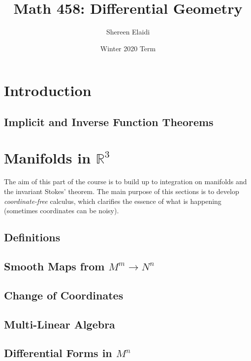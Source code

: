 \documentclass[11pt]{scrartcl}
\title{\textbf{Math 458: Differential Geometry}}
\author{Shereen Elaidi}
\date{Winter 2020 Term}
\newcommand{\R}[0]{\mathbb{R}}
\theoremstyle{definition}
\theoremstyle{remark}
\begin{document}
\maketitle
\tableofcontents
\pagestyle{fancy}
\lfoot{}
\cfoot{}
\rfoot{}
\renewcommand{\headrulewidth}{0.4pt}
\renewcommand{\footrulewidth}{0.4pt}
\setlength{\tabcolsep}{0.5em} %
{\renewcommand{\arraystretch}{1.2}%

\section{Introduction}
\subsection{Implicit and Inverse Function Theorems}

\section{Manifolds in $\R^3$}
The aim of this part of the course is to build up to integration on manifolds and the invariant Stokes' theorem. The main purpose of this sections is to develop \emph{coordinate-free} calculus, which clarifies the essence of what is happening (sometimes coordinates can be noisy). 
\subsection{Definitions}

\subsection{Smooth Maps from $M^m \rightarrow N^n$}

\subsection{Change of Coordinates}

\subsection{Multi-Linear Algebra}

\subsection{Differential Forms in $M^n$}

}
\end{document}
